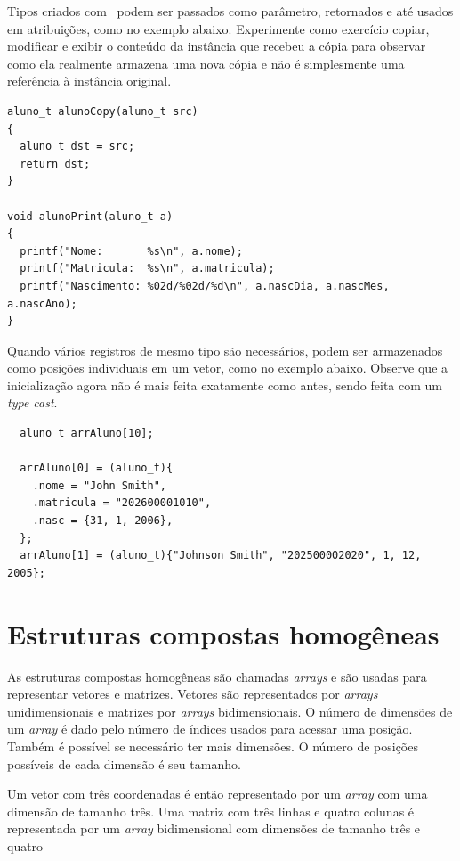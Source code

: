 Tipos criados com \STRUCT\ podem ser passados como parâmetro, retornados e até usados em atribuições, como no exemplo abaixo. Experimente como exercício copiar, modificar e exibir o conteúdo da instância que recebeu a cópia para observar como ela realmente armazena uma nova cópia e não é simplesmente uma referência à instância original.

\begin{lstlisting}
aluno_t alunoCopy(aluno_t src)
{
  aluno_t dst = src;
  return dst;
}

void alunoPrint(aluno_t a)
{
  printf("Nome:       %s\n", a.nome);
  printf("Matricula:  %s\n", a.matricula);
  printf("Nascimento: %02d/%02d/%d\n", a.nascDia, a.nascMes, a.nascAno);
}
\end{lstlisting}

Quando vários registros de mesmo tipo são necessários, podem ser armazenados como posições individuais em um vetor, como no exemplo abaixo. Observe que a inicialização agora não é mais feita exatamente como antes, sendo feita com um \textit{type cast}.

\begin{lstlisting}
  aluno_t arrAluno[10];

  arrAluno[0] = (aluno_t){
    .nome = "John Smith",
    .matricula = "202600001010",
    .nasc = {31, 1, 2006},
  };
  arrAluno[1] = (aluno_t){"Johnson Smith", "202500002020", 1, 12, 2005};
\end{lstlisting}


\section{Estruturas compostas homogêneas}

As estruturas compostas homogêneas são chamadas \textit{arrays} e são usadas para representar vetores e matrizes. Vetores são representados por \textit{arrays} unidimensionais e matrizes por \textit{arrays} bidimensionais. O número de dimensões de um \textit{array} é dado pelo número de índices usados para acessar uma posição. Também é possível se necessário ter mais dimensões. O número de posições possíveis de cada dimensão é seu tamanho.

Um vetor com três coordenadas é então representado por um \textit{array} com uma dimensão de tamanho três. Uma matriz com três linhas e quatro colunas é representada por um \textit{array} bidimensional com dimensões de tamanho três e quatro

